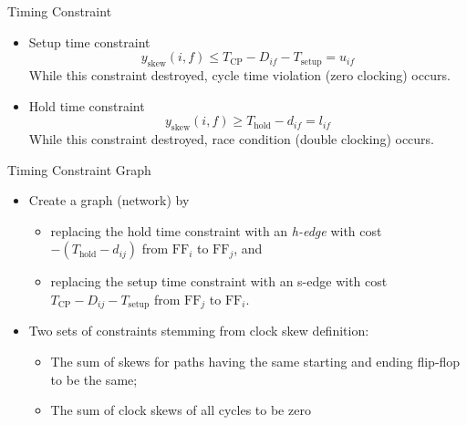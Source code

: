 \documentclass[
  ignorenonframetext,
]{beamer}
\providecommand{\tightlist}{%
  \setlength{\itemsep}{0pt}\setlength{\parskip}{0pt}}
\begin{document}
\begin{frame}{Timing Constraint}
\protect\hypertarget{timing-constraint}{}
\begin{itemize}
\tightlist
\item
  Setup time constraint
  \[y_\text{skew}(i,f) \le T_\text{CP} - D_{if} - T_\text{setup} = u_{if}\]
  While this constraint destroyed, cycle time violation (zero clocking)
  occurs.
\item
  Hold time constraint
  \[y_\text{skew}(i,f) \ge T_\text{hold} - d_{if} = l_{if}\] While this
  constraint destroyed, race condition (double clocking) occurs.
\end{itemize}
\end{frame}

\begin{frame}{Timing Constraint Graph}
\protect\hypertarget{timing-constraint-graph}{}
\begin{itemize}
\tightlist
\item
  Create a graph (network) by

  \begin{itemize}
  \tightlist
  \item
    replacing the hold time constraint with an \emph{h-edge} with cost
    \(-(T_\text{hold} - d_{ij})\) from \(\text{FF}_i\) to
    \(\text{FF}_j\), and
  \item
    replacing the setup time constraint with an s-edge with cost
    \(T_\text{CP} - D_{ij} - T_\text{setup}\) from \(\text{FF}_j\) to
    \(\text{FF}_i\).
  \end{itemize}
\item
  Two sets of constraints stemming from clock skew definition:

  \begin{itemize}
  \tightlist
  \item
    The sum of skews for paths having the same starting and ending
    flip-flop to be the same;
  \item
    The sum of clock skews of all cycles to be zero
  \end{itemize}
\end{itemize}
\end{frame}
\end{document}
